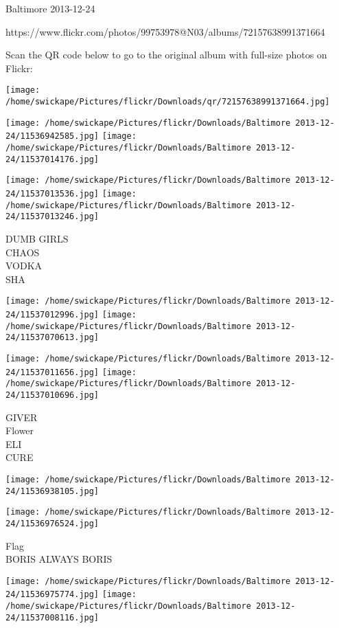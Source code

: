 \documentclass[10pt,letterpaper]{article}
\begin{document}
Baltimore 2013-12-24

https://www.flickr.com/photos/99753978@N03/albums/72157638991371664

Scan the QR code below to go to the original album with full-size photos on Flickr:

\texttt{[image: /home/swickape/Pictures/flickr/Downloads/qr/72157638991371664.jpg]}
\pagebreak

\texttt{[image: /home/swickape/Pictures/flickr/Downloads/Baltimore 2013-12-24/11536942585.jpg]}
\texttt{[image: /home/swickape/Pictures/flickr/Downloads/Baltimore 2013-12-24/11537014176.jpg]}

\texttt{[image: /home/swickape/Pictures/flickr/Downloads/Baltimore 2013-12-24/11537013536.jpg]}
\texttt{[image: /home/swickape/Pictures/flickr/Downloads/Baltimore 2013-12-24/11537013246.jpg]}

DUMB GIRLS\\
CHAOS\\
VODKA\\
SHA
\pagebreak

\texttt{[image: /home/swickape/Pictures/flickr/Downloads/Baltimore 2013-12-24/11537012996.jpg]}
\texttt{[image: /home/swickape/Pictures/flickr/Downloads/Baltimore 2013-12-24/11537070613.jpg]}

\texttt{[image: /home/swickape/Pictures/flickr/Downloads/Baltimore 2013-12-24/11537011656.jpg]}
\texttt{[image: /home/swickape/Pictures/flickr/Downloads/Baltimore 2013-12-24/11537010696.jpg]}

GIVER\\
Flower\\
ELI\\
CURE
\pagebreak

\texttt{[image: /home/swickape/Pictures/flickr/Downloads/Baltimore 2013-12-24/11536938105.jpg]}

\vspace{0.25in}
\texttt{[image: /home/swickape/Pictures/flickr/Downloads/Baltimore 2013-12-24/11536976524.jpg]}

Flag\\
BORIS ALWAYS BORIS
\pagebreak

\texttt{[image: /home/swickape/Pictures/flickr/Downloads/Baltimore 2013-12-24/11536975774.jpg]}
\texttt{[image: /home/swickape/Pictures/flickr/Downloads/Baltimore 2013-12-24/11537008116.jpg]}
\end{document}

